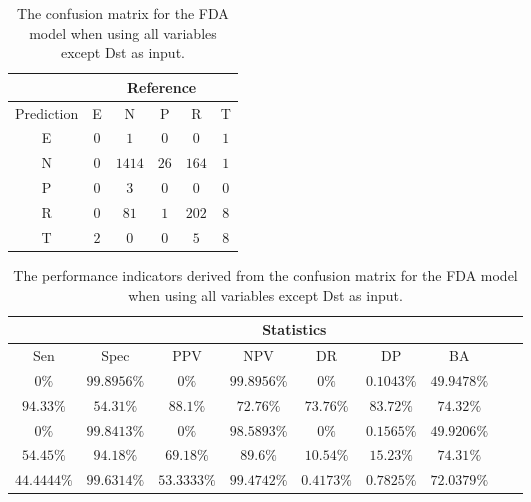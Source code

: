 \begin{table}[!ht]
	\centering
	\begin{tabular}{|c|c|c|c|c|c|}
		\hline
		 & \multicolumn{5}{|c|}{Reference} \\ \hline
		 Prediction & E & N & P & R & T \\ \hline
		 E & $0$ & $1$ & $0$ & $0$ & $1$ \\ \hline
		 N & $0$ & $1414$ & $26$ & $164$ & $1$ \\ \hline
		 P & $0$ & $3$ & $0$ & $0$ & $0$ \\ \hline
		 R & $0$ & $81$ & $1$ & $202$ & $8$ \\ \hline
		 T & $2$ & $0$ & $0$ & $5$ & $8$ \\ \hline
	\end{tabular}
	\caption{The confusion matrix for the FDA model when using all variables except Dst as input.}
	\label{tab:cm:noDst:fda}
\end{table}

\begin{table}[!ht]
	\centering
	\begin{tabular}{|c|c|c|c|c|c|c|c|c|}
		\hline
		 & \multicolumn{7}{c|}{Statistics} \\ \hline
		Sen & Spec & PPV & NPV & DR & DP & BA \\ \hline
		$0\%$ & $99.8956\%$ & $0\%$ & $99.8956\%$ & $0\%$ & $0.1043\%$ & $49.9478\%$ \\ \hline
		$94.33\%$ & $54.31\%$ & $88.1\%$ & $72.76\%$ & $73.76\%$ & $83.72\%$ & $74.32\%$ \\ \hline
		$0\%$ & $99.8413\%$ & $0\%$ & $98.5893\%$ & $0\%$ & $0.1565\%$ & $49.9206\%$ \\ \hline
		$54.45\%$ & $94.18\%$ & $69.18\%$ & $89.6\%$ & $10.54\%$ & $15.23\%$ & $74.31\%$ \\ \hline
		$44.4444\%$ & $99.6314\%$ & $53.3333\%$ & $99.4742\%$ & $0.4173\%$ & $0.7825\%$ & $72.0379\%$ \\ \hline
	\end{tabular}
	\caption{The performance indicators derived from the confusion matrix for the FDA model when using all variables except Dst as input.}
	\label{tab:cs:noDst:fda}
\end{table}

